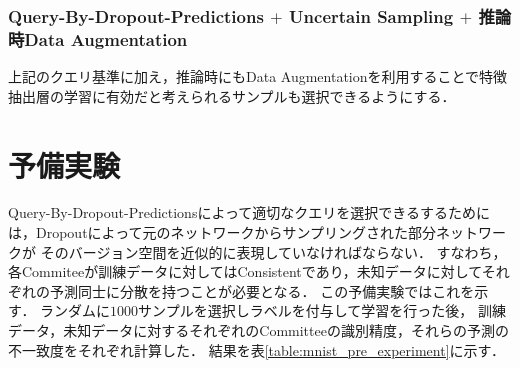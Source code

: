 \subsubsection{Query-By-Dropout-Predictions $+$ Uncertain Sampling $+$ 推論時Data Augmentation}
上記のクエリ基準に加え，推論時にもData Augmentationを利用することで特徴抽出層の学習に有効だと考えられるサンプルも選択できるようにする．


\section{予備実験}
Query-By-Dropout-Predictionsによって適切なクエリを選択できるするためには，Dropoutによって元のネットワークからサンプリングされた部分ネットワークが
そのバージョン空間を近似的に表現していなければならない．
すなわち，各Commiteeが訓練データに対してはConsistentであり，未知データに対してそれぞれの予測同士に分散を持つことが必要となる．
この予備実験ではこれを示す．
ランダムに$1000$サンプルを選択しラベルを付与して学習を行った後，
訓練データ，未知データに対するそれぞれのCommitteeの識別精度，それらの予測の不一致度をそれぞれ計算した．
結果を表\ref{table:mnist_pre_experiment}に示す．

